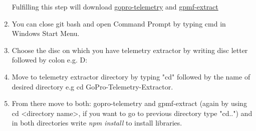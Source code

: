 \documentclass[a4paper,12pt]{book}
\begin{document}
\begin{enumerate}
	Fulfilling this step will download \href{https://github.com/JuanIrache/gopro-telemetry}{gopro-telemetry} and \href{https://github.com/JuanIrache/gpmf-extract}{gpmf-extract}
	\item You can close git bash and open Command Prompt by typing cmd in Windows Start Menu.
	\item Choose the disc on which you have telemetry extractor by writing disc letter followed by colon e.g. D:
	\item Move to telemetry extractor directory by typing "cd" followed by the name of desired directory e.g cd GoPro-Telemetry-Extractor.
	\item From there move to both: gopro-telemetry and gpmf-extract (again by using cd <directory name>, if you want to go to previous directory type "cd..") and in both directories write \textit{npm install} to install libraries.
\end{enumerate}
\end{document}
